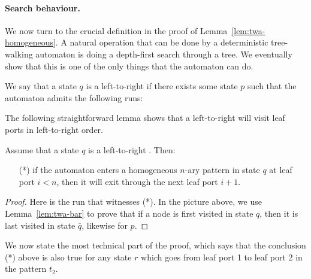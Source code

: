 \paragraph*{Search behaviour.} We now turn to the crucial definition in the proof of Lemma~\ref{lem:twa-homogeneous}. A natural operation that can be done by a deterministic tree-walking automaton is doing a depth-first search through a tree. We eventually show that this is one of the only things that the automaton can do.

\begin{definition}
We say that a state $q$ is a left-to-right \dfs if there exists some state $p$ such  that the automaton admits the following runs:
\end{definition}
The following straightforward lemma shows that a left-to-right \dfs will visit leaf ports in left-to-right order.
\begin{lemma}\label{lem:dfs-does}
Assume that a state $q$ is a left-to-right \dfs. Then:
\begin{itemize}
	\item[(*)]if  the automaton enters a homogeneous $n$-ary pattern in state $q$ at  leaf port $i<n$, then it will exit through the next leaf port $i+1$.
\end{itemize}
\end{lemma}
\begin{proof}
Here is the run that witnesses (*).
In the picture above, we use Lemma~\ref{lem:twa-bar} to prove that if a node is first visited in state $q$, then it is last visited in state $\bar q$, likewise for $p$. 
\end{proof}
We now state the most technical part of the proof, which says that the conclusion (*) above is also true for any state $r$ which goes from leaf port 1 to leaf port 2 in the pattern $t_2$.

